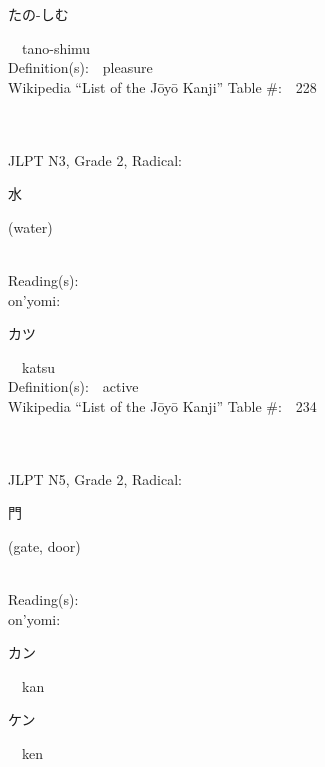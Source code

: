 \begin{multicols}{2}
{\hspace*{2em}}{\begin{CJK}{UTF8}{min} たの-しむ \end{CJK}}\ \ tano-shimu\ \ \\
Definition(s):\ \ pleasure \\
Wikipedia ``List of the J\=oy\=o Kanji'' Table \#:\ \ 228 \\
\ \ \\
{\fontsize{34pt}{40pt}  }\ \ \\  %
{JLPT N3, Grade 2, Radical:\ \ {\begin{CJK}{UTF8}{min} 水 \end{CJK}} (water) } \\
Reading(s):\ \ \\
{\hspace*{1em}}on'yomi:\ \ \\
{\hspace*{2em}}{\begin{CJK}{UTF8}{min} カツ \end{CJK}}\ \ katsu\ \ \\
Definition(s):\ \ active \\
Wikipedia ``List of the J\=oy\=o Kanji'' Table \#:\ \ 234 \\
\ \ \\
{\fontsize{34pt}{40pt}  }\ \ \\  %
{JLPT N5, Grade 2, Radical:\ \ {\begin{CJK}{UTF8}{min} 門 \end{CJK}} (gate, door) } \\
Reading(s):\ \ \\
{\hspace*{1em}}on'yomi:\ \ \\
{\hspace*{2em}}{\begin{CJK}{UTF8}{min} カン \end{CJK}}\ \ kan\ \ \\
{\hspace*{2em}}{\begin{CJK}{UTF8}{min} ケン \end{CJK}}\ \ ken\ \ \\

\end{multicols}
